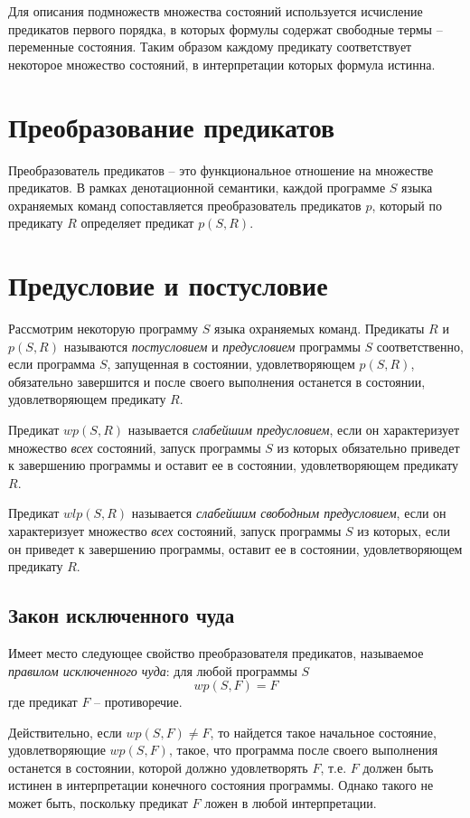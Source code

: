 Для описания подмножеств множества состояний используется 
исчисление предикатов первого порядка, в которых формулы содержат свободные термы -- 
переменные состояния. Таким образом каждому предикату соответствует некоторое множество состояний,
в интерпретации которых формула истинна.

\section{Преобразование предикатов}
Преобразователь предикатов -- это функциональное отношение на множестве предикатов.
В рамках денотационной семантики, каждой программе $S$ языка охраняемых
команд сопоставляется преобразователь предикатов $p$, который по предикату
$R$ определяет предикат $p(S, R)$.

\section{Предусловие и постусловие}
Рассмотрим некоторую программу $S$ языка охраняемых команд. Предикаты $R$ и $p(S, R)$ 
называются \textit{постусловием} и \textit{предусловием} программы $S$ соответственно, 
если программа $S$, запущенная в состоянии, удовлетворяющем $p(S,R)$, 
обязательно завершится и после своего выполнения останется в состоянии,
удовлетворяющем предикату $R$.

Предикат $wp(S, R)$ называется \textit{слабейшим предусловием}, если он 
характеризует множество \textit{всех} состояний, запуск программы $S$ из которых
обязательно приведет к завершению программы и оставит ее в состоянии,
удовлетворяющем предикату $R$.

Предикат $wlp(S, R)$ называется \textit{слабейшим свободным предусловием}, если он 
характеризует множество \textit{всех} состояний, запуск программы $S$ из которых,
если он приведет к завершению программы, оставит ее в состоянии, удовлетворяющем предикату $R$.

\subsection{Закон исключенного чуда}
Имеет место следующее свойство преобразователя предикатов,
называемое \textit{правилом исключенного чуда}: для любой программы $S$
\begin{equation}
	wp(S, F) = F
\end{equation}
где предикат $F$ -- противоречие.

Действительно, если $wp(S, F) \neq F$, то найдется такое начальное состояние, удовлетворяющие $wp(S, F)$, такое, что
программа после своего выполнения останется в состоянии, которой должно удовлетворять $F$, т.е. $F$ должен быть истинен
в интерпретации конечного состояния программы. Однако такого не может быть, поскольку предикат $F$ ложен в любой 
интерпретации.


